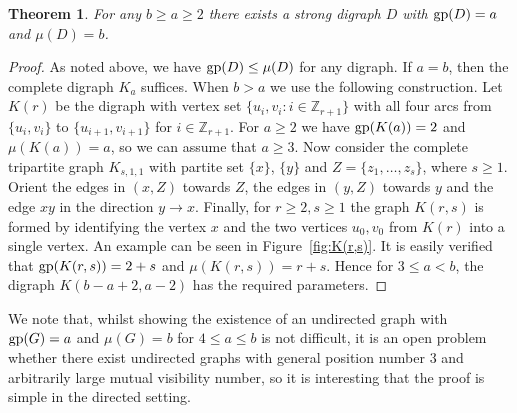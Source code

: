 \documentclass[a4paper,12pt]{article}
\newtheorem{theorem}{Theorem}[section]
\theoremstyle{definition}
\newcommand{\gp}{{\rm gp}}
\begin{document}
	\begin{theorem}
		For any $b \geq a \geq 2$ there exists a strong digraph $D$ with $\gp (D) = a$ and $\mu (D) = b$. 
	\end{theorem}
	\begin{proof}
		As noted above, we have $\gp (D) \leq \mu (D)$ for any digraph. If $a = b$, then the complete digraph $K_a$ suffices. When $b > a$ we use the following construction. Let $K(r)$ be the digraph with vertex set $\{ u_i,v_i : i \in \mathbb{Z}_{r+1}\}$ with all four arcs from $\{ u_i,v_i\} $ to $\{ u_{i+1},v_{i+1}\} $ for $i \in \mathbb{Z}_{r+1}$. For $a \geq 2$ we have $\gp (K(a)) = 2$ and $\mu (K(a)) = a$, so we can assume that $a \geq 3$. Now consider the complete tripartite graph $K_{s,1,1}$ with partite set $\{ x\} $, $\{ y\} $ and $Z = \{ z_1,\ldots ,z_s\} $, where $s \geq 1$.  Orient the edges in $(x,Z)$ towards $Z$, the edges in $(y,Z)$ towards $y$ and the edge $xy$ in the direction $y \rightarrow x$. Finally, for $r \geq 2, s \geq 1$ the graph $K(r,s)$ is formed by identifying the vertex $x$ and the two vertices $u_0,v_0$ from $K(r)$ into a single vertex. An example can be seen in Figure~\ref{fig:K(r,s)}. It is easily verified that $\gp (K(r,s)) = 2+s$ and $\mu (K(r,s)) = r+s$. Hence for $3 \leq a < b$, the digraph $K(b-a+2,a-2)$ has the required parameters. 
	\end{proof}
	
	We note that, whilst showing the existence of an undirected graph with $\gp (G) = a$ and $\mu (G) = b$ for $4 \leq a \leq b$ is not difficult, it is an open problem whether there exist undirected graphs with general position number 3 and arbitrarily large mutual visibility number, so it is interesting that the proof is simple in the directed setting.
	
\end{document}
